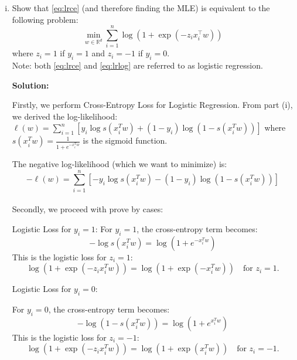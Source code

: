 \documentclass{article}
\newenvironment{solution}{\color{blue} \smallskip \textbf{Solution:}}{}
\begin{document}
\begin{enumerate}[(a)]
\begin{enumerate}[(i)]
\begin{solution}
Thirdly, Maximizing the log-likelihood is equivalent to minimizing the negative log-likelihood:
\[
\min_w -\ell(w) = \min_w \sum_{i=1}^{n} \left[ -y_i \log s(x_i^T w) - (1 - y_i) \log(1 - s(x_i^T w)) \right]
\]

Thus, upon comparison, finding the MLE of \( w \) is equivalent to minimizing the cross-entropy:
\[
\min_w \sum_{i=1}^{n} H(\text{Ber}(y_i), \text{Ber}(s(x_i^T w)))
\]


        \end{solution}
    
        \item 
        Show that \eqref{eq:lrce} (and therefore finding the MLE) is equivalent to the following problem:
        \begin{equation}
        \label{eq:lrlog}
            \min_{w\in\mathbb R^d} \sum_{i=1}^n \log(1+\exp(-z_i x_i^\top w))
        \end{equation}
        where $z_i = 1$ if $y_i=1$ and $z_i = -1$ if $y_i=0$.\\
        Note: both \eqref{eq:lrce} and \eqref{eq:lrlog} are referred to as logistic regression.
        
        \begin{solution}

Firstly, we perform Cross-Entropy Loss for Logistic Regression. From part (i), we derived the log-likelihood:
\(
\ell(w) = \sum_{i=1}^{n} \left[ y_i \log s(x_i^T w) + (1 - y_i) \log(1 - s(x_i^T w)) \right]
\)
where \( s(x_i^T w) = \frac{1}{1 + e^{-x_i^T w}} \) is the sigmoid function.

The negative log-likelihood (which we want to minimize) is:
\[
-\ell(w) = \sum_{i=1}^{n} \left[ -y_i \log s(x_i^T w) - (1 - y_i) \log(1 - s(x_i^T w)) \right]
\]\\

Secondly, we proceed with prove by cases:

Logistic Loss for \( y_i = 1 \): 
For \( y_i = 1 \), the cross-entropy term becomes:
\[
- \log s(x_i^T w) = \log(1 + e^{-x_i^T w})
\]
This is the logistic loss for \( z_i = 1 \):
\[
\log(1 + \exp(-z_i x_i^T w)) = \log(1 + \exp(-x_i^T w)) \quad \text{for } z_i = 1.
\]

Logistic Loss for \( y_i = 0 \):

For \( y_i = 0 \), the cross-entropy term becomes:
\[
- \log(1 - s(x_i^T w)) = \log(1 + e^{x_i^T w})
\]
This is the logistic loss for \( z_i = -1 \):
\[
\log(1 + \exp(-z_i x_i^T w)) = \log(1 + \exp(x_i^T w)) \quad \text{for } z_i = -1.
\]


\end{solution}
\end{enumerate}
\end{enumerate}
\end{document}
